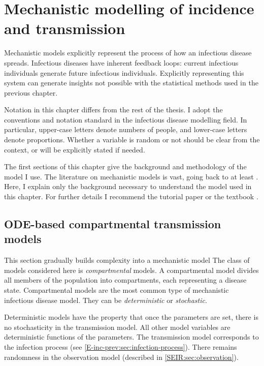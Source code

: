 \documentclass[thesis.tex]{subfiles}
\begin{document}
\chapter{Mechanistic modelling of incidence and transmission} \label{SEIR}

Mechanistic models explicitly represent the process of how an infectious disease spreads.
Infectious diseases have inherent feedback loops: current infectious individuals generate future infectious individuals.
Explicitly representing this system can generate insights not possible with the statistical methods used in the previous chapter.

Notation in this chapter differs from the rest of the thesis.
I adopt the conventions and notation standard in the infectious disease modelling field.
In particular, upper-case letters denote numbers of people, and lower-case letters denote proportions.
Whether a variable is random or not should be clear from the context, or will be explicitly stated if needed.

The first sections of this chapter give the background and methodology of the model I use.
The literature on mechanistic models is vast, going back to at least \textcite{kermackContribution}.
Here, I explain only the background necessary to understand the model used in this chapter.
For further details I recommend the tutorial paper \textcite{kretzschmarMathematical} or the textbook \textcite{keelingModeling}.

\section{ODE-based compartmental transmission models} \label{SEIR:sec:transmission}

This section gradually builds complexity into a mechanistic model
The class of models considered here is \emph{compartmental} models.
A compartmental model divides all members of the population into compartments, each representing a disease state.
Compartmental models are the most common type of mechanistic infectious disease model.
They can be \emph{deterministic} or \emph{stochastic}.

Deterministic models have the property that once the parameters are set, there is no stochasticity in the transmission model.
All other model variables are deterministic functions of the parameters.
The transmission model corresponds to the infection process (see \cref{E-inc-prev:sec:infection-process}).
There remains randomness in the observation model (described in \cref{SEIR:sec:observation}).
\end{document}
